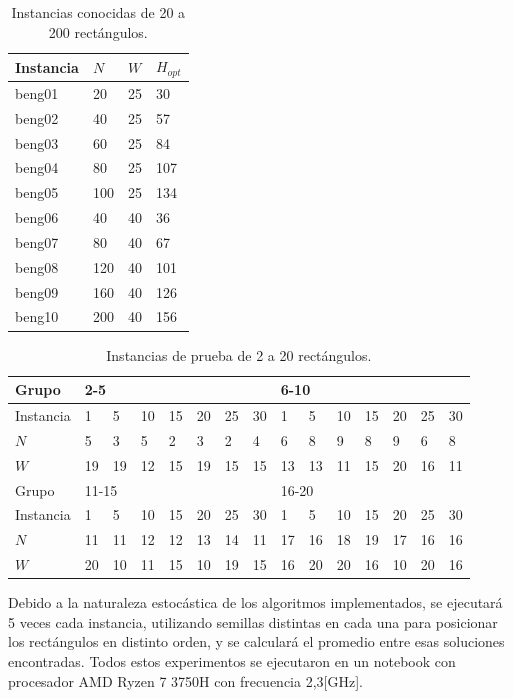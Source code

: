 \documentclass[letter, 10pt]{article}
\begin{document}
\begin{table}[H]
\centering
\begin{tabular}{|l|lll|}
\hline
Instancia & $N$ & $W$ & $H_{opt}$ \\ \hline
beng01 & 20 & 25 & 30 \\ \hline
beng02 & 40 & 25 & 57 \\ \hline
beng03 & 60 & 25 & 84 \\ \hline
beng04 & 80 & 25 & 107 \\ \hline
beng05 & 100 & 25 & 134 \\ \hline
beng06 & 40 & 40 & 36 \\ \hline
beng07 & 80 & 40 & 67 \\ \hline
beng08 & 120 & 40 & 101 \\ \hline
beng09 & 160 & 40 & 126 \\ \hline
beng10 & 200 & 40 & 156 \\ \hline
\end{tabular}
\caption{Instancias conocidas de 20 a 200 rect\'angulos.}
\label{tab:conocidas}
\end{table}

\begin{table}[H]
\centering
\begin{tabular}{|l|lllllll|lllllll|}
\hline
Grupo & \multicolumn{7}{l|}{2-5} & \multicolumn{7}{l|}{6-10} \\ \hline
Instancia & 1 & 5 & 10 & 15 & 20 & 25 & 30 & 1 & 5 & 10 & 15 & 20 & 25 & 30 \\ \hline
$N$ & 5 & 3 & 5 & 2 & 3 & 2 & 4 & 6 & 8 & 9 & 8 & 9 & 6 & 8 \\ \hline
$W$ & 19 & 19 & 12 & 15 & 19 & 15 & 15 & 13 & 13 & 11 & 15 & 20 & 16 & 11 \\ \hline
Grupo & \multicolumn{7}{l|}{11-15} & \multicolumn{7}{l|}{16-20} \\ \hline
Instancia & 1 & 5 & 10 & 15 & 20 & 25 & 30 & 1 & 5 & 10 & 15 & 20 & 25 & 30 \\ \hline
$N$ & 11 & 11 & 12 & 12 & 13 & 14 & 11 & 17 & 16 & 18 & 19 & 17 & 16 & 16 \\ \hline
$W$ & 20 & 10 & 11 & 15 & 10 & 19 & 15 & 16 & 20 & 20 & 16 & 10 & 20 & 16 \\ \hline
\end{tabular}
\caption{Instancias de prueba de 2 a 20 rect\'angulos.}
\label{tab:pruebas}
\end{table}

Debido a la naturaleza estoc\'astica de los algoritmos implementados, se ejecutar\'a 5 veces cada instancia, utilizando semillas distintas en cada una para posicionar los rect\'angulos en distinto orden, y se calcular\'a el promedio entre esas soluciones encontradas. Todos estos experimentos se ejecutaron en un notebook con procesador AMD Ryzen 7 3750H con frecuencia 2,3[GHz].
\end{document}
